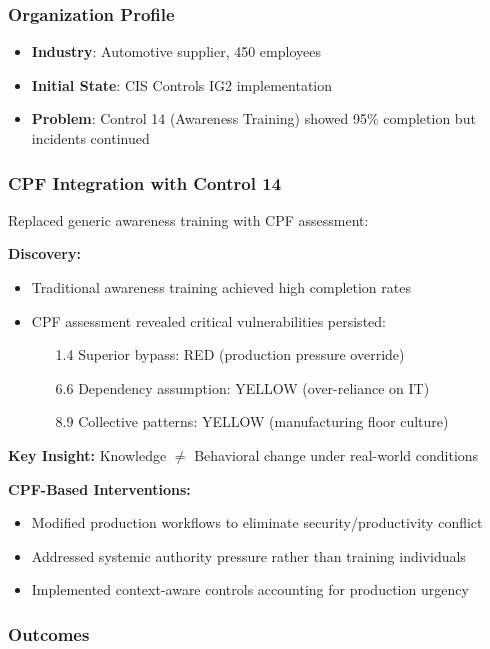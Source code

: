 \documentclass[11pt,a4paper]{article}
\begin{document}
\subsubsection{Organization Profile}
\begin{itemize}
\item \textbf{Industry}: Automotive supplier, 450 employees
\item \textbf{Initial State}: CIS Controls IG2 implementation
\item \textbf{Problem}: Control 14 (Awareness Training) showed 95\% completion but incidents continued
\end{itemize}

\subsubsection{CPF Integration with Control 14}

Replaced generic awareness training with CPF assessment:

\textbf{Discovery:}
\begin{itemize}
\item Traditional awareness training achieved high completion rates
\item CPF assessment revealed critical vulnerabilities persisted:
  \begin{itemize}
  \item [1.4] Superior bypass: RED (production pressure override)
  \item [6.6] Dependency assumption: YELLOW (over-reliance on IT)
  \item [8.9] Collective patterns: YELLOW (manufacturing floor culture)
  \end{itemize}
\end{itemize}

\textbf{Key Insight:} Knowledge $\neq$ Behavioral change under real-world conditions

\textbf{CPF-Based Interventions:}
\begin{itemize}
\item Modified production workflows to eliminate security/productivity conflict
\item Addressed systemic authority pressure rather than training individuals
\item Implemented context-aware controls accounting for production urgency
\end{itemize}

\subsubsection{Outcomes}
\end{document}
